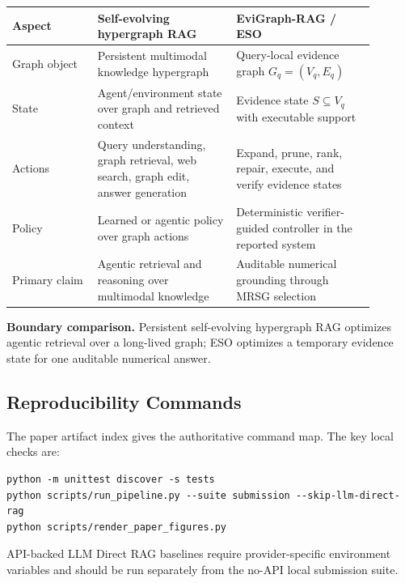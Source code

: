 \begin{center}
\centering
\small
\begin{tabular}{p{0.21\linewidth}p{0.34\linewidth}p{0.34\linewidth}}
\hline
Aspect & Self-evolving hypergraph RAG & EviGraph-RAG / ESO \\
\hline
Graph object & Persistent multimodal knowledge hypergraph & Query-local evidence graph \(G_q=(V_q,E_q)\) \\
State & Agent/environment state over graph and retrieved context & Evidence state \(S \subseteq V_q\) with executable support \\
Actions & Query understanding, graph retrieval, web search, graph edit, answer generation & Expand, prune, rank, repair, execute, and verify evidence states \\
Policy & Learned or agentic policy over graph actions & Deterministic verifier-guided controller in the reported system \\
Primary claim & Agentic retrieval and reasoning over multimodal knowledge & Auditable numerical grounding through MRSG selection \\
\hline
\end{tabular}

\vspace{0.25em}
\noindent\textbf{Boundary comparison.} Persistent self-evolving hypergraph RAG
optimizes agentic retrieval over a long-lived graph; ESO optimizes a temporary
evidence state for one auditable numerical answer.
\end{center}

\subsection{Reproducibility Commands}

The paper artifact index gives the authoritative command map.  The key local
checks are:
\begin{verbatim}
python -m unittest discover -s tests
python scripts/run_pipeline.py --suite submission --skip-llm-direct-rag
python scripts/render_paper_figures.py
\end{verbatim}
API-backed LLM Direct RAG baselines require provider-specific environment
variables and should be run separately from the no-API local submission suite.
